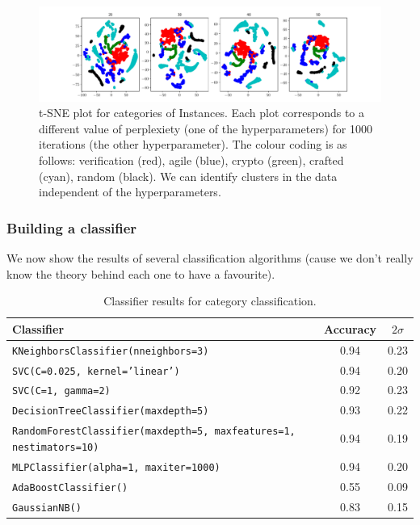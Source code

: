 \documentclass[10pt]{article}
\begin{document}
\begin{figure}[h]
\includegraphics[width=\linewidth]{tSNE/Category.pdf}
\caption{t-SNE plot for categories of Instances. Each plot corresponds to a
different value of perplexiety (one of the hyperparameters) for 1000 iterations
(the other hyperparameter). The colour coding is as follows: verification
(red), agile (blue), crypto (green), crafted (cyan),  random (black). We can
identify clusters in the data independent of the hyperparameters.}
\end{figure}

\subsubsection{Building a classifier}
We now show the results of several classification algorithms (cause we don't
really know the theory behind each one to have a favourite).

\begin{table}
\begin{center}
\renewcommand{\arraystretch}{1.2}
\begin{tabular}{ l  c  c }
 \label{tab:MNIST}
 Classifier & Accuracy & $2\sigma$ \\
 \hline
  \texttt{KNeighborsClassifier(nneighbors=3)} & 0.94 & 0.23 \\
  \texttt{SVC(C=0.025, kernel='linear')} & 0.94  & 0.20 \\
  \texttt{SVC(C=1, gamma=2)} & 0.92 & 0.23 \\
  \texttt{DecisionTreeClassifier(maxdepth=5)} & 0.93 & 0.22 \\
  \texttt{RandomForestClassifier(maxdepth=5, maxfeatures=1, nestimators=10)} & 0.94 & 0.19 \\
  \texttt{MLPClassifier(alpha=1, maxiter=1000)} & 0.94 & 0.20 \\
  \texttt{AdaBoostClassifier()} & 0.55 & 0.09 \\
  \texttt{GaussianNB()} & 0.83 & 0.15
\end{tabular}
\caption{Classifier results for category classification.}
\end{center}
\end{table}
\end{document}
